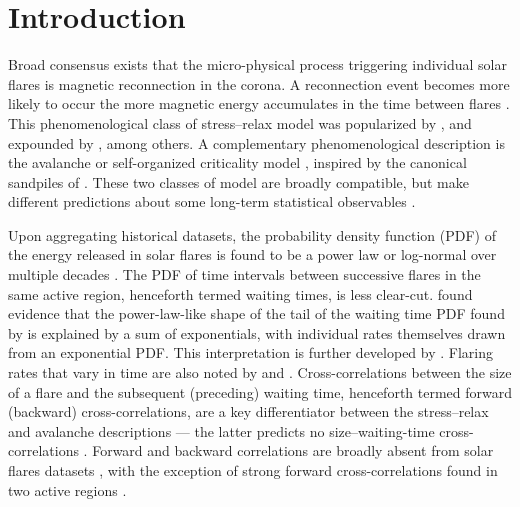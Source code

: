 \section{Introduction} \label{sec:sf_intro}
Broad consensus exists that the micro-physical process triggering individual solar flares is magnetic reconnection in the corona. A reconnection event becomes more likely to occur the more magnetic energy accumulates in the time between flares \citep{Priest2002, Benz2016}. This phenomenological class of stress--relax model was popularized by \citet{Rosner1978}, and expounded by \citet{Wheatland1998, Wheatland2000corr, Wheatland2008, Kanazir2010, Hudson2019}, among others. A complementary phenomenological description is the avalanche or self-organized criticality model \citep{Lu1991, Lu1993, Lu1995}, inspired by the canonical sandpiles of \citet{Bak1987, Bak1988}. These two classes of model are broadly compatible, but make different predictions about some long-term statistical observables \citep{Lu1995a, Boffetta1999, Wheatland2000corr, Lippiello2010, Farhang2019, Aschwanden2021a}. 

Upon aggregating historical datasets, the probability density function (PDF) of the energy released in solar flares is found to be a power law or log-normal over multiple decades \citep{Rosner1978, Lu1991, Verbeeck2019}. The PDF of time intervals between successive flares in the same active region, henceforth termed waiting times, is less clear-cut. \citet{Wheatland2000delt} found evidence that the power-law-like shape of the tail of the waiting time PDF found by \citet{Boffetta1999} is explained by a sum of exponentials, with individual rates themselves drawn from an exponential PDF. This interpretation is further developed by \citet{Aschwanden2021}. Flaring rates that vary in time are also noted by \citet{Lepreti2001} and \citet{Gorobets2012}. Cross-correlations between the size of a flare and the subsequent (preceding) waiting time, henceforth termed forward (backward) cross-correlations, are a key differentiator between the stress--relax and avalanche descriptions --- the latter predicts no size--waiting-time cross-correlations \citep{Jensen1998}. Forward and backward correlations are broadly absent from solar flares datasets \citep{Biesecker1994, Hudson1998, Crosby1998, Wheatland2000corr, Hudson2020}, with the exception of strong forward cross-correlations found in two active regions \citep{Hudson2019}.

